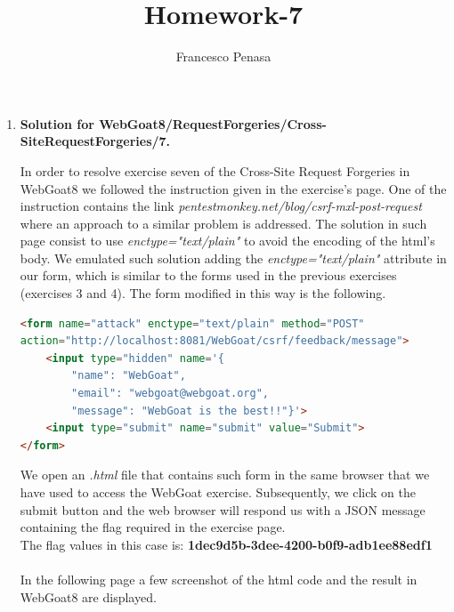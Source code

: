 \documentclass[11pt]{article}
\begin{document}
\author{Francesco Penasa}
\title{Homework-7}
\maketitle

\medskip

\begin{enumerate}

\item
\textbf{Solution for WebGoat8/RequestForgeries/Cross-SiteRequestForgeries/7.}

In order to resolve exercise seven of the Cross-Site Request Forgeries in WebGoat8 we followed the instruction given in the exercise's page. One of the instruction contains the link \textit{pentestmonkey.net/blog/csrf-mxl-post-request} where an approach to a similar problem is addressed. The solution in such page consist to use \textit{enctype="text/plain"} to avoid the encoding of the html's body. 
We emulated such solution adding the \textit{enctype="text/plain"} attribute in our form, which is similar to the forms used in the previous exercises (exercises 3 and 4). 
The form modified in this way is the following.
\begin{lstlisting}[language=html]
<form name="attack" enctype="text/plain" method="POST"
action="http://localhost:8081/WebGoat/csrf/feedback/message">
	<input type="hidden" name='{
		"name": "WebGoat", 
		"email": "webgoat@webgoat.org", 
		"message": "WebGoat is the best!!"}'>
	<input type="submit" name="submit" value="Submit">
</form>
\end{lstlisting}
We open an \textit{.html} file that contains such form in the same browser that we have used to access the WebGoat exercise. 
Subsequently, we click on the submit button and the web browser will respond us with a JSON message containing the flag required in the exercise page.\\
The flag values in this case is: \textbf{1dec9d5b-3dee-4200-b0f9-adb1ee88edf1}\\
\\

In the following page a few screenshot of the html code and the result in WebGoat8 are displayed.



\end{enumerate}
\end{document}
